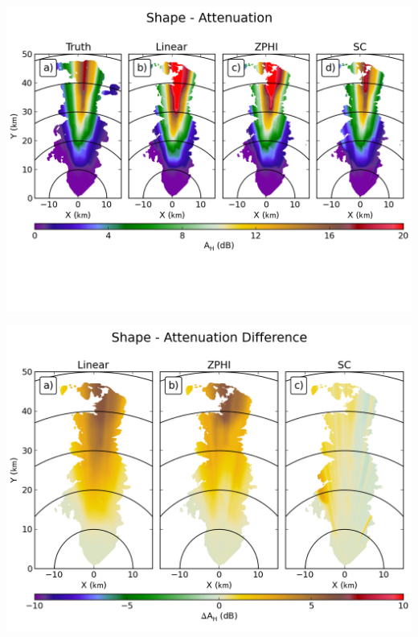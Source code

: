 \documentclass[red]{beamer}
\begin{document}
\begin{frame}
	\begin{center}
		\includegraphics[scale=0.55]{figures/C_Shape_Attenuation.png}
	\end{center}
\end{frame}

\begin{frame}
	\begin{center}
		\includegraphics[scale=0.45]{figures/C_Shape_Attenuation_Difference.png}
	\end{center}
\end{frame}
\end{document}
